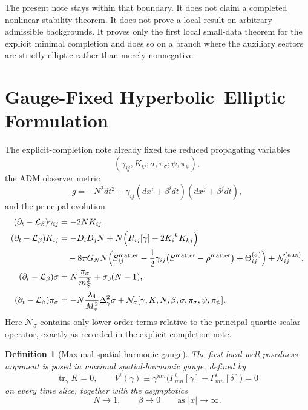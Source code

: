 \documentclass[11pt]{article}
\newcommand{\Ell}{\mathcal{L}}
\newtheorem{definition}{Definition}
\begin{document}
The present note stays within that boundary. It does not claim a completed nonlinear stability theorem. It does not prove a local result on arbitrary admissible backgrounds. It proves only the first local small-data theorem for the explicit minimal completion and does so on a branch where the auxiliary sectors are strictly elliptic rather than merely nonnegative.

\section{Gauge-Fixed Hyperbolic--Elliptic Formulation}

The explicit-completion note already fixed the reduced propagating variables
\begin{equation}
(\gamma_{ij},K_{ij};\sigma,\pi_\sigma;\psi,\pi_\psi),
\label{eq:reducedunknowns}
\end{equation}
the ADM observer metric
\begin{equation}
g=-N^2dt^2+\gamma_{ij}(dx^i+\beta^idt)(dx^j+\beta^jdt),
\label{eq:ADM}
\end{equation}
and the principal evolution
\begin{align}
(\partial_t-\Ell_\beta)\gamma_{ij} &= -2N K_{ij},
\label{eq:gammadt}
\\
(\partial_t-\Ell_\beta)K_{ij}
&=
-D_iD_jN
+N\Bigl(R_{ij}[\gamma]-2K_i{}^kK_{kj}\Bigr)
\nonumber\\
&\quad
-8\pi G_N N
\Bigl(
S_{ij}^{\mathrm{matter}}
-\frac{1}{2}\gamma_{ij}\bigl(S^{\mathrm{matter}}-\rho^{\mathrm{matter}}\bigr)
+\Theta_{ij}^{(\sigma)}
\Bigr)
+\mathcal N_{ij}^{(\mathrm{aux})},
\label{eq:Kdt}
\\
(\partial_t-\Ell_\beta)\sigma
&=
N\frac{\pi_\sigma}{m_S^2}
+\sigma_0(N-1),
\label{eq:sigmadt}
\\
(\partial_t-\Ell_\beta)\pi_\sigma
&=
-N\frac{\lambda_4}{M_*^2}\Delta_\gamma^2\sigma
+\mathcal N_\sigma[\gamma,K,N,\beta,\sigma,\pi_\sigma,\psi,\pi_\psi].
\label{eq:pidt}
\end{align}
Here \(\mathcal N_\sigma\) contains only lower-order terms relative to the principal quartic scalar operator, exactly as recorded in the explicit-completion note.

\begin{definition}[Maximal spatial-harmonic gauge]
The first local well-posedness argument is posed in \emph{maximal spatial-harmonic gauge}, defined by
\begin{equation}
\operatorname{tr}_\gamma K=0,
\qquad
V^i(\gamma)\equiv \gamma^{mn}\bigl(\Gamma^i_{mn}[\gamma]-\Gamma^i_{mn}[\delta]\bigr)=0
\label{eq:gauge}
\end{equation}
on every time slice, together with the asymptotics
\begin{equation}
N\to 1,
\qquad
\beta\to 0
\qquad
\text{as } |x|\to\infty.
\label{eq:gaugeasym}
\end{equation}
\end{definition}
\end{document}
